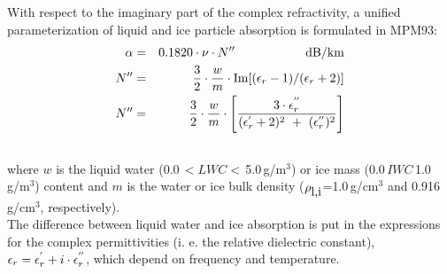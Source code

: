 With respect to the imaginary part of the complex refractivity, a 
unified parameterization of liquid and ice particle absorption 
is formulated in MPM93:
\begin{eqnarray}
  \label{eq:abs_theory:abs_cloud}
  \alpha & = & 0.1820 \cdot \nu \cdot\imn\hspace*{20mm}
               \mbox{dB/km}\\
    \imn & = & \frac{3}{2} \cdot \frac{w}{m} \cdot 
               \Im{[(\er-1)/(\er+2)]}\nonumber\\
    \imn & = & \frac{3}{2} \cdot \frac{w}{m} \cdot 
               \left[\frac{3\cdot\ime}{(\ree+2)^2~+~(\ime)^2}\right]\nonumber\\
  \nonumber
\end{eqnarray}
where $w$ is the liquid water (0.0\,$<LWC<$\,5.0\,g/m$^3$) or ice
mass (0.0\,$IWC$\,1.0\,g/m$^3$) content and $m$ is the water 
or ice bulk density ($\rho_{\mbox{\rm l,i}}$=1.0\,g/cm$^3$ and 0.916\,g/cm$^3$, respectively).\\
The difference between liquid water and ice absorption is put in the 
expressions for the complex permittivities (i. e. the relative 
dielectric constant), $\epsilon_r=\epsilon^{'}_r+i\cdot\epsilon^{''}_r$, which depend on frequency
and temperature.

